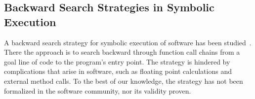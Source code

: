 \subsection{Backward Search Strategies in Symbolic Execution}

A backward search strategy for symbolic execution of software has been
studied~\cite{ma2011directed,chandra09,dinges04,charreteur10}. There the approach is to search
backward through function call chains from a goal line of code to the program's
entry point. The strategy is hindered by complications that arise in software,
such as floating point calculations and external method calls. To the best of our knowledge, the strategy has not been formalized
in the software community, nor its validity proven. 

